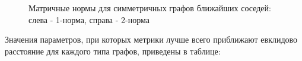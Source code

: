 
\begin{figure}[h]
  \begin{minipage}[h]{0.49\linewidth}
  \end{minipage}
  \hfill
  \begin{minipage}[h]{0.49\linewidth}
  \end{minipage}

  \caption{Матричные нормы для симметричных графов ближайших соседей: слева - 1-норма, справа - 2-норма}
  \label{img:sym_graphs_norm}  
\end{figure}



Значения параметров, при которых метрики лучше всего приближают евклидово расстояние для каждого типа графов, приведены в таблице:


